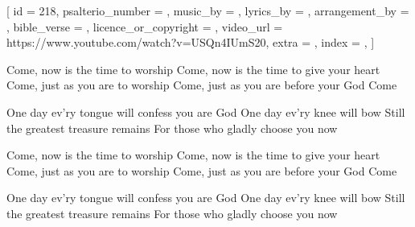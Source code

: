 
[
    id = {218},
    psalterio_number = {},
    music_by = {},
    lyrics_by = {},
    arrangement_by = {},
    bible_verse = {},
    licence_or_copyright = {},
    video_url = {https://www.youtube.com/watch?v=USQn4IUmS20},
    extra = {},
    index = {},
]


\beginverse
Come, now is the time to worship
Come, now is the time to give your heart
Come, just as you are to worship
Come, just as you are before your God
Come
\endverse


\beginchorus
One day ev'ry tongue will confess you are God
One day ev'ry knee will bow
Still the greatest treasure remains
For those who gladly choose you now
\endchorus


\beginverse
Come, now is the time to worship
Come, now is the time to give your heart
Come, just as you are to worship
Come, just as you are before your God
Come
\endverse


\beginchorus
One day ev'ry tongue will confess you are God
One day ev'ry knee will bow
Still the greatest treasure remains
For those who gladly choose you now
\endchorus


\endsong
